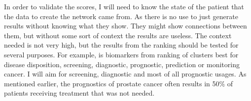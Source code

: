 In order to validate the scores, I will need to know the state of the patient
that the data to create the network came from. As there is no use to just
generate results without knowing what they show. They might show connections
between them, but without some sort of context the results are useless. The
context needed is not very high, but the results from the ranking should be
tested for several purposes. For example, is biomarkers from ranking of clusters
best for disease disposition, screening, diagnostic, prognostic, prediction or
monitoring cancer. I will aim for screening, diagnostic and most of all
prognostic usages. As mentioned earlier, the prognostics of prostate cancer
often results in 50\% of patients receiving treatment that was not needed.

